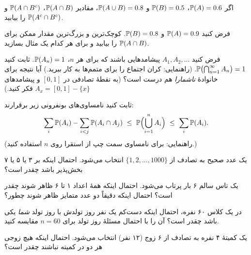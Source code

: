 \begin{exercise}
اگر $\P(A)=0.6$، $\P(B)=0.5$ و $\P(A\cup B)=0.8$، مقادیر $\P(A\cap B)$، $\P(A\cap B^c)$ و $\P(A^c\cap B^c)$ را بیابید.
\end{exercise}

\begin{exercise}
فرض کنید $\P(A)=0.9$ و $\P(B)=0.8$. کوچک‌ترین و بزرگ‌ترین مقدار ممکن برای $\P(A\cap B)$ را بیابید و برای هر کدام یک مثال بسازید.
\end{exercise}

\begin{exercise}
فرض کنید $A_1,A_2,\dots$ پیشامدهایی باشند که برای هر $n$، $\P(A_n)=1$. ثابت کنید $\P\bigl(\bigcap_{n=1}^\infty A_n\bigr)=1$. (راهنمایی: کران اجتماع را برای متمم‌ها به کار ببرید.) آیا نتیجه برای خانوادهٔ \emph{ناشمارا} هم درست است؟ (به نقطهٔ تصادفی در $[0,1]$ و پیشامدهای $A_x=[0,1]-\{x\}$ فکر کنید.)
\end{exercise}

\begin{exercise}\hard
ثابت کنید نامساوی‌های بونفرونی زیر برقرارند:
\[ \sum_i\P(A_i)-\sum_{i<j}\P(A_i\cap A_j)\ \le\ \P\Bigl(\bigcup_{i=1}^nA_i\Bigr)\ \le\ \sum_i\P(A_i). \]
(راهنمایی: برای نامساوی سمت چپ از استقرا روی $n$ استفاده کنید.)
\end{exercise}

\begin{exercise}
یک عدد صحیح به تصادف از $\{1,2,\dots,1000\}$ انتخاب می‌شود. احتمال اینکه بر ۳ یا ۵ یا ۷ بخش‌پذیر باشد چقدر است؟
\end{exercise}

\begin{exercise}
یک تاس سالم ۶ بار پرتاب می‌شود. احتمال اینکه همهٔ اعداد ۱ تا ۶ ظاهر شوند چقدر است؟ احتمال اینکه دقیقاً دو عدد متمایز ظاهر شوند چطور؟
\end{exercise}

\begin{exercise}
در یک کلاس ۶۰ نفره، احتمال اینکه دست‌کم یک نفر روز تولدش با روز تولد \emph{شما} یکی باشد چقدر است؟ آن را با احتمال مسئلهٔ روز تولد برای $n=60$ مقایسه کنید.
\end{exercise}

\begin{exercise}
یک کمیتهٔ ۴ نفره به تصادف از ۶ زوج (۱۲ نفر) انتخاب می‌شود. احتمال اینکه هیچ زوجی هر دو در کمیته نباشند چقدر است؟
\end{exercise}

